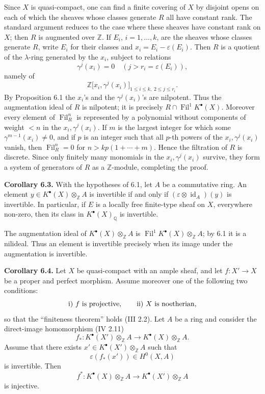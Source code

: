 \documentclass[11pt]{article}
\newcommand{\Fil}{\operatorname{Fil}}
\begin{document}
Since \(X\) is quasi-compact, one can find a finite covering of \(X\) by disjoint opens on each of which the sheaves whose classes generate \(R\) all have constant rank. The standard argument reduces to the case where these sheaves have constant rank on \(X\); then \(R\) is augmented over \(\mathbb Z\). If \(E_i\), \(i=1,\ldots,k\), are the sheaves whose classes generate \(R\), write \(E_i\) for their classes and \(x_i=E_i-\varepsilon(E_i)\). Then \(R\) is a quotient of the \(\lambda\)-ring generated by the \(x_i\), subject to relations
\[
  \gamma^j(x_i)=0\quad(j>r_i=\varepsilon(E_i)),
\]
namely of
\[
  \mathbb Z\bigl[x_i,\gamma^j(x_i)\bigr]_{1\leq i\leq k,\; 2\leq j\leq r_i}.
\]
By Proposition 6.1 the \(x_i\)'s and the \(\gamma^j(x_i)\)'s are nilpotent. Thus the augmentation ideal of \(R\) is nilpotent; it is precisely \(R\cap\Fil^1K^\bullet(X)\). Moreover every element of \(\Fil_R^n\) is represented by a polynomial without components of weight \(<n\) in the \(x_i,\gamma^j(x_i)\). If \(m\) is the largest integer for which some \(\gamma^{m-1}(x_i)\neq0\), and if \(p\) is an integer such that all \(p\)-th powers of the \(x_i,\gamma^j(x_i)\) vanish, then \(\Fil_R^n=0\) for \(n>kp(1+\cdots+m)\). Hence the filtration of \(R\) is discrete. Since only finitely many monomials in the \(x_i,\gamma^j(x_i)\) survive, they form a system of generators of \(R\) as a \(\mathbb Z\)-module, completing the proof.

\textbf{Corollary 6.3.} With the hypotheses of 6.1, let \(A\) be a commutative ring. An element \(y\in K^\bullet(X)\otimes_{\mathbb Z}A\) is invertible if and only if \((\varepsilon\otimes\operatorname{id}_A)(y)\) is invertible. In particular, if \(E\) is a locally free finite-type sheaf on \(X\), everywhere non-zero, then its class in \(K^\bullet(X)_{\mathbb Q}\) is invertible.

The augmentation ideal of \(K^\bullet(X)\otimes_{\mathbb Z}A\) is \(\Fil^1K^\bullet(X)\otimes_{\mathbb Z}A\); by 6.1 it is a nilideal. Thus an element is invertible precisely when its image under the augmentation is invertible.

\textbf{Corollary 6.4.} Let \(X\) be quasi-compact with an ample sheaf, and let \(f:X'\to X\) be a proper and perfect morphism. Assume moreover one of the following two conditions:
\[
\text{\rm i) } f\text{ is projective},\qquad
\text{\rm ii) } X\text{ is noetherian},
\]
so that the ``finiteness theorem'' holds (III 2.2). Let \(A\) be a ring and consider the direct-image homomorphism (IV 2.11)
\[
  f_*:K^\bullet(X')\otimes_{\mathbb Z}A
  \longrightarrow K^\bullet(X)\otimes_{\mathbb Z}A.
\]
Assume that there exists \(x'\in K^\bullet(X')\otimes_{\mathbb Z}A\) such that
\[
  \varepsilon(f_*(x'))\in H^0(X,A)
\]
is invertible. Then
\[
  f^*:K^\bullet(X)\otimes_{\mathbb Z}A
       \longrightarrow K^\bullet(X')\otimes_{\mathbb Z}A
\]
is injective.
\end{document}
